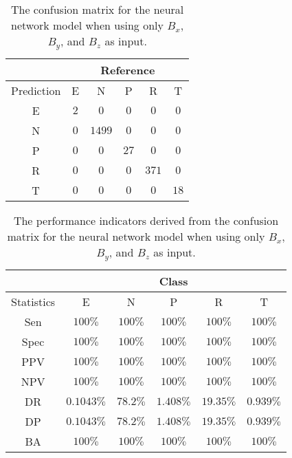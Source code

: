 \begin{table}[!ht]
	\centering
	\begin{tabular}{|c|c|c|c|c|c|}
		\hline
		 & \multicolumn{5}{|c|}{Reference} \\ \hline
		 Prediction & E & N & P & R & T \\ \hline
		 E & $2$ & $0$ & $0$ & $0$ & $0$ \\ \hline
		 N & $0$ & $1499$ & $0$ & $0$ & $0$ \\ \hline
		 P & $0$ & $0$ & $27$ & $0$ & $0$ \\ \hline
		 R & $0$ & $0$ & $0$ & $371$ & $0$ \\ \hline
		 T & $0$ & $0$ & $0$ & $0$ & $18$ \\ \hline
	\end{tabular}
	\caption{The confusion matrix for the neural network model when using only $B_{x}$, $B_{y}$, and $B_{z}$ as input.}
	\label{tab:cm:coord:nnet}
\end{table}

\begin{table}[!ht]
	\centering
	\begin{tabular}{|c|c|c|c|c|c|}
		\hline
		 & \multicolumn{5}{c|}{Class} \\ \hline
		Statistics & E & N & P & R & T \\ \hline
		Sen & $100\%$ & $100\%$ & $100\%$ & $100\%$ & $100\%$ \\ \hline
		Spec & $100\%$ & $100\%$ & $100\%$ & $100\%$ & $100\%$ \\ \hline
		PPV & $100\%$ & $100\%$ & $100\%$ & $100\%$ & $100\%$ \\ \hline
		NPV & $100\%$ & $100\%$ & $100\%$ & $100\%$ & $100\%$ \\ \hline
		DR & $0.1043\%$ & $78.2\%$ & $1.408\%$ & $19.35\%$ & $0.939\%$ \\ \hline
		DP & $0.1043\%$ & $78.2\%$ & $1.408\%$ & $19.35\%$ & $0.939\%$ \\ \hline
		BA & $100\%$ & $100\%$ & $100\%$ & $100\%$ & $100\%$ \\ \hline
	\end{tabular}
	\caption{The performance indicators derived from the confusion matrix for the neural network model when using only $B_{x}$, $B_{y}$, and $B_{z}$ as input.}
	\label{tab:cs:reverse:coord:nnet}
\end{table}

